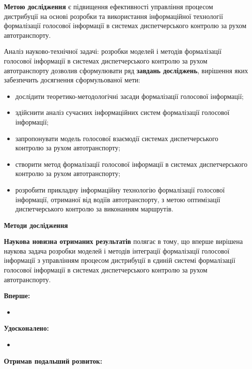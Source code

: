 \textbf{Метою дослідження} є підвищення ефективності управління процесом дистрибуції на основі розробки та використання інформаційної технології формалізації голосової інформації в системах диспетчерського контролю за рухом автотранспорту.

Аналіз науково-технічної задачі: розробки моделей і методів формалізації голосової інформації в системах диспетчерського контролю за рухом автотранспорту дозволив сформулювати ряд \textbf{завдань досліджень}, вирішення яких забезпечить досягнення сформульованої мети:

\begin{itemize}
	\item дослідити теоретико-методологічні засади формалізації голосової інформації;
	\item здійснити аналіз сучасних інформаційних систем формалізації голосової інформації;
	\item запропонувати модель голосової взаємодії системах диспетчерського контролю за рухом автотранспорту;
	\item створити метод формалізації голосової інформації в системах диспетчерського контролю за рухом автотранспорту;
	\item розробити прикладну інформаційну технологію формалізації голосової інформації, отриманої від водіїв автотранспорту, з метою оптимізації диспетчерського контролю за виконанням маршрутів.
	
\end{itemize}

\textbf{Методи дослідження} 

\textbf{Наукова новизна отриманих результатів} полягає в тому, що вперше вирішена наукова задача розробки моделей і методів інтеграції формалізації голосової інформації з управлінням процесом дистрибуції в єдиній системі формалізації голосової інформації в системах диспетчерського контролю за рухом автотранспорту.

\textbf{Вперше:}

\begin{itemize}
	\item {}
\end{itemize}

\textbf{Удосконалено:}

\begin{itemize}
	\item {}
\end{itemize}

\textbf{Отримав подальший розвиток:}

